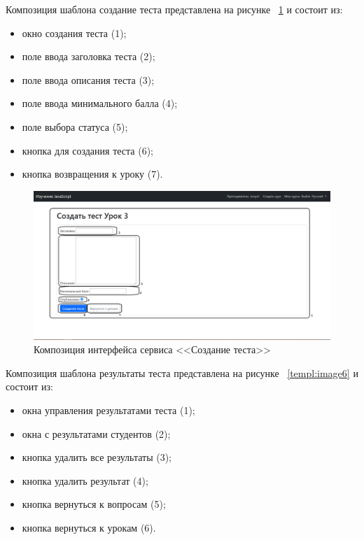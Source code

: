 Композиция шаблона создание теста представлена на рисунке ~\ref{templ:image5} и состоит из:

\begin{itemize}
	\item окно создания теста (1);
	\item поле ввода заголовка теста (2);
	\item поле ввода описания теста (3);
	\item поле ввода минимального балла (4);
	\item поле выбора статуса (5);
	\item кнопка для создания теста (6);
	\item кнопка возвращения к уроку (7).
\end{itemize}

\begin{figure}[h]
	\centering
	\includegraphics[width=1\linewidth]{images/создатьтест}
	\caption{Композиция интерфейса сервиса <<Создание теста>>}
	\label{templ:image5}
\end{figure}
\newpage

Композиция шаблона результаты теста представлена на рисунке ~\ref{templ:image6} и состоит из:

\begin{itemize}
	\item окна управления результатами теста (1);
	\item окна с результатами студентов  (2);
	\item кнопка удалить все результаты (3);
	\item кнопка удалить результат (4);
	\item кнопка вернуться к вопросам (5);
	\item кнопка вернуться к урокам (6).
\end{itemize}

